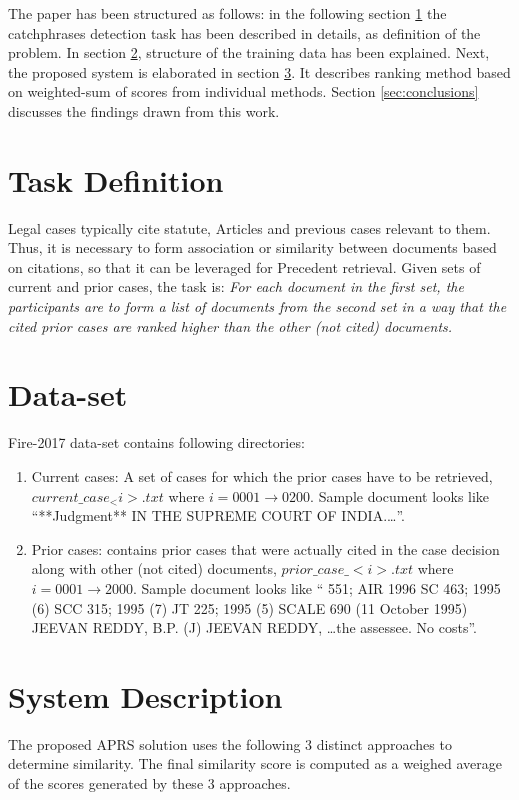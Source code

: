 The paper has been structured as follows: in the following section \ref{sec:taskdef} the catchphrases detection task has been described in details, as definition of the problem. In section \ref{sec:datares}, structure of the training data has been explained. Next, the proposed system is elaborated in section \ref{sec:sysdescr}. It describes ranking method based on weighted-sum of scores from individual methods. Section \ref{sec:conclusions} discusses the findings drawn from this work.


\section{Task Definition}
\label{sec:taskdef}

Legal cases typically cite statute, Articles and previous cases relevant to them. Thus, it is necessary to form association or similarity between documents based on citations, so that it can be leveraged for Precedent retrieval.  Given sets of current and prior cases, the task is: {\em For each document in the first set, the participants are to form a list of documents from the second set in a way that the cited prior cases are ranked higher than the other (not cited) documents.}\cite{fire2017}

\section{Data-set}
\label{sec:datares} 
Fire-2017 \cite{fire2017} data-set contains following directories:
\begin{enumerate}
	\item Current cases: A set of cases for which the prior cases have to be retrieved, $current\_case_<i>.txt$ where $i = 0001 \rightarrow 0200$. Sample document looks like ``**Judgment** IN THE SUPREME COURT OF INDIA.\ldots''.
	\item Prior cases: contains prior cases that were actually cited in the case decision along with other (not cited) documents, $prior\_case\_<i>.txt$ where $i = 0001 \rightarrow 2000$. Sample document looks like `` 551; AIR 1996 SC 463; 1995 (6) SCC 315; 1995 (7) JT 225; 1995 (5) SCALE 690 (11 October 1995)
JEEVAN REDDY, B.P. (J) JEEVAN REDDY, \ldots the assessee. No costs''.
\end{enumerate}


\section{System Description}
\label{sec:sysdescr} 
The proposed APRS solution uses the following 3 distinct approaches to determine similarity. The final similarity score is computed as a weighed average of the scores generated by these 3 approaches.
